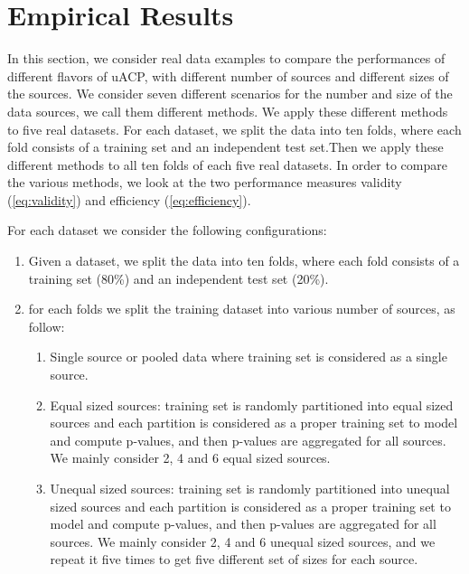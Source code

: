 \documentclass[main]{subfiles}
\begin{document}
\section{Empirical Results}\label{sec:results}
In this section, we consider real data examples to compare the performances of different flavors of uACP, with different number of sources and different sizes of the sources. We consider seven different scenarios for the number and size of the data sources, we call them different methods.  We apply these different methods to five real datasets. For each dataset, we split the data into ten folds, where each fold consists of a training set and an independent test set.Then we apply these different methods to all ten folds of each five real datasets. In order to compare the various methods, we look at the two performance measures validity (\ref{eq:validity}) and efficiency (\ref{eq:efficiency}). %

For each dataset we consider the following configurations:

\begin{enumerate}

\item Given a dataset, we split the data into ten folds, where each fold consists of a training set (80\%) and an independent test set (20\%).

\item for each folds we split the training dataset into various number of sources, as follow:
\begin{enumerate}
	\item Single source or pooled data  where training set is considered as a single source.
	\item Equal sized sources: training set is randomly partitioned into equal sized sources and  each partition is considered as a proper training set to model and compute p-values, and then p-values are aggregated for all sources. We mainly consider 2, 4 and 6 equal sized sources. %
	\item Unequal sized sources: training set is randomly partitioned into unequal sized sources and  each partition is considered as a proper training set to model and compute p-values, and then p-values are aggregated for all sources. We mainly consider 2, 4 and 6 unequal sized sources, and we repeat it five times to get five different set of sizes for each source.

\end{enumerate}

\end{enumerate}
\end{document}
